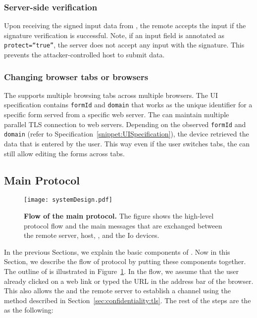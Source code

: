 \subsubsection{\bfseries Server-side verification} \label{sec:systemDesign:commit:verification}Upon receiving the signed input data from \device, the remote accepts the input if the signature verification is successful. Note, if an input field is annotated as \texttt{protect=``true''}, the server does not accept any input with the \device signature. This prevents the attacker-controlled host to submit data. 

\subsubsection{\bfseries Changing browser tabs or browsers}
The \device supports multiple browsing tabs across multiple browsers. The UI specification contains \texttt{formId} and \texttt{domain} that works as the unique identifier for a specific form served from a specific web server. The \device can maintain multiple parallel TLS connection to web servers. Depending on the observed \texttt{formId} and \texttt{domain} (refer to Specification~\ref{snippet:UISpecification}), the device retrieved the data that is entered by the user. This way even if the user switches tabs, the \device can still allow editing the forms across tabs.


\subsection{Main Protocol}
\label{sec:systemDesign:mainProtocol}

\begin{figure}[t]
\centering
\texttt{[image: systemDesign.pdf]}
\caption{\textbf{Flow of the \name main protocol.} The figure shows the high-level protocol flow and the main messages that are exchanged between the remote server, host, \device, and the Io devices.}
\spacesave
\label{fig:systemDesign}
\centering
\end{figure}


In the previous Sections, we explain the basic components of \name. Now in this Section, we describe the flow of \name protocol by putting these components together. The outline of \name is illustrated in Figure~\ref{fig:systemDesign}. In the flow, we assume that the user already clicked on a web link or typed the URL in the address bar of the browser. This also allows the \device and the remote server to establish a \tls channel using the method described in Section~\ref{sec:confidentiality:tls}. The rest of the steps are the as the following:


